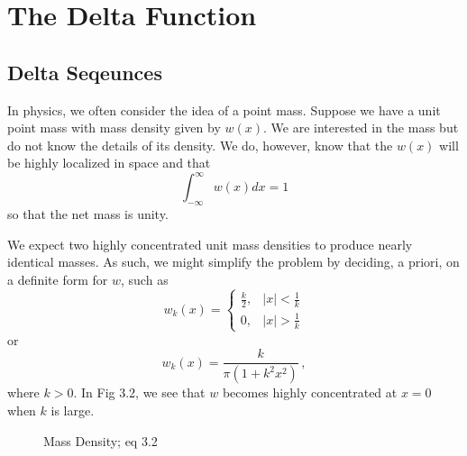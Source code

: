 \section{The Delta Function}
\subsection{Delta Seqeunces}
In physics, we often consider the idea of a point mass. Suppose we have a unit point mass with mass density given by \(w(x)\). We are interested in the mass but do not know the details of its density. We do, however, know that the \(w(x)\) will be highly localized in space and that 
\begin{equation}
    \int_{-\infty}^{\infty} w(x) dx = 1
\end{equation}
so that the net mass is unity.

We expect two highly concentrated unit mass densities to produce nearly identical masses. As such, we might simplify the problem by deciding, a priori, on a definite form for \(w\), such as
\begin{equation}
    w_k(x) = \begin{cases}
        \frac{k}{2}, & |x|<\frac{1}{k}\\
        0, & |x|>\frac{1}{k}
    \end{cases}
\end{equation}
or
\begin{equation}
    w_k(x)=\frac{k}{\pi (1+k^2x^2)}\,,
\end{equation}
where \(k>0\). In Fig 3.2, we see that \(w\) becomes highly concentrated at \(x=0\) when \(k\) is large.

\begin{figure}
    \centering
    \caption{Mass Density; eq 3.2}
\end{figure}


